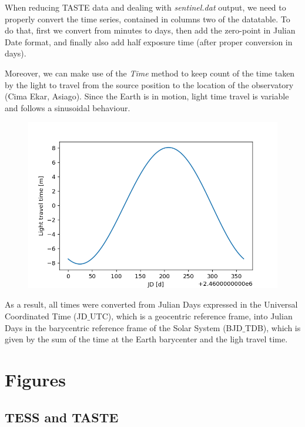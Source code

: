 \documentclass{aa}
\begin{document}
When reducing TASTE data and dealing with \textit{sentinel.dat} output, we need to properly convert the 
time series, contained in columns two of the datatable. To do that, first we
convert from minutes to days, then add the zero-point in Julian Date format, and 
finally also add half exposure time (after proper conversion in days).

Moreover, we can make use of the \textit{Time} method to keep count of the time 
taken by the light to travel from the source position to the location of the 
observatory (Cima Ekar, Asiago). Since the Earth is in motion, light time 
travel is variable and follows a sinusoidal behaviour.
\begin{figure}[H]
    \centering  
    \includegraphics[scale=0.4, angle=0]{pictures/time_corr.png}
\end{figure}

As a result, all times were converted from Julian Days expressed in the Universal Coordinated Time (JD$\_$UTC), which is a geocentric reference frame, into Julian Days in the barycentric reference frame of the Solar System (BJD$\_$TDB), which is given by the sum of the time at the Earth barycenter and the ligh travel time.


\section{Figures}




\subsection{TESS and TASTE}
\label{sect:app_C_TT}
\end{document}
